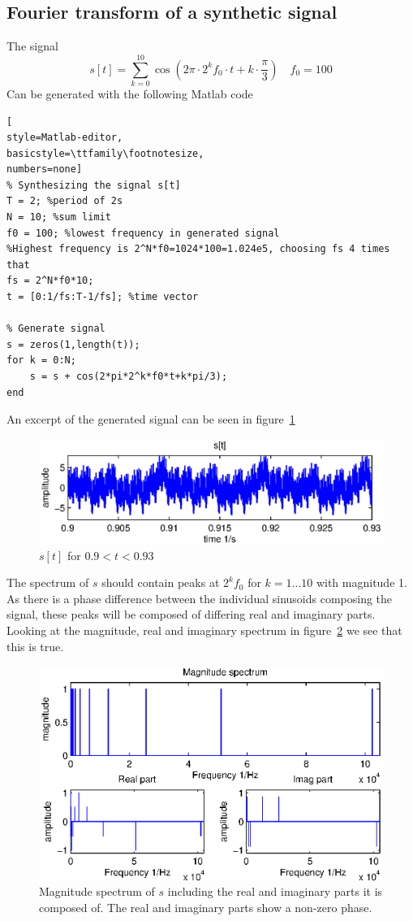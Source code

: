 \subsection{Fourier transform of a synthetic signal}
The signal 
\begin{equation}
	s[t] = \sum_{k=0}^{10}\cos(2\pi\cdot2^k f_0\cdot t +k\cdot\frac{\pi}{3}) \quad f_0 = 100
\end{equation}
Can be generated with the following Matlab code
\begin{lstlisting}[
style=Matlab-editor,
basicstyle=\ttfamily\footnotesize,
numbers=none]
% Synthesizing the signal s[t]
T = 2; %period of 2s
N = 10; %sum limit
f0 = 100; %lowest frequency in generated signal
%Highest frequency is 2^N*f0=1024*100=1.024e5, choosing fs 4 times that
fs = 2^N*f0*10;
t = [0:1/fs:T-1/fs]; %time vector

% Generate signal
s = zeros(1,length(t));
for k = 0:N;
    s = s + cos(2*pi*2^k*f0*t+k*pi/3);
end
\end{lstlisting}
An excerpt of the generated signal can be seen in figure~\ref{fig:1.2-1}
\begin{figure}
	\center
	\includegraphics{./picture/3-1-2.eps}
	\caption{\(s[t]\) for \(0.9< t<0.93\)}
	\label{fig:1.2-1}
\end{figure}

The spectrum of \(s\) should contain peaks at \(2^kf_0\) for \(k=1\ldots 10\) with magnitude 1. As there is a phase difference 
between the individual sinusoids composing the signal, these peaks will be composed of differing real and imaginary parts. Looking
at the magnitude, real and imaginary spectrum in figure~\ref{fig:1.2-2} we see that this is true. 


\begin{figure}[H]
	\center
	\includegraphics{./picture/3-1-3.eps}
	\caption{Magnitude spectrum of \(s\) including the real and imaginary parts it is composed of. The real and imaginary parts 
	show a non-zero phase.}
	\label{fig:1.2-2}
\end{figure}

